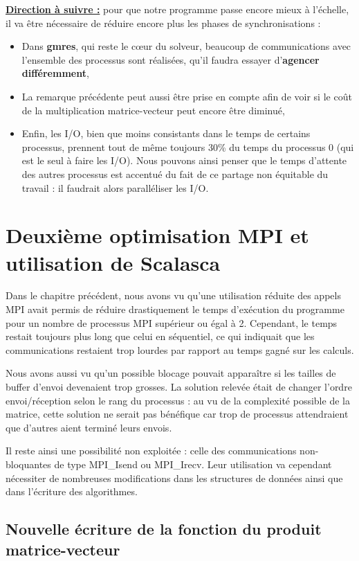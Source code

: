 \documentclass[11pt,a4paper,oneside]{memoir}
\theoremstyle{definition}
\theoremstyle{remark}
\theoremstyle{plain}
\begin{document}
\textbf{\underline{Direction à suivre :}} pour que notre programme passe encore mieux à l'échelle, il va être nécessaire de réduire encore plus les phases de synchronisations :
\begin{itemize}
\item Dans \textbf{gmres}, qui reste le cœur du solveur, beaucoup de communications avec l'ensemble des processus sont réalisées, qu'il faudra essayer d'\textbf{agencer différemment},
\item La remarque précédente peut aussi être prise en compte afin de voir si le coût de la multiplication matrice-vecteur peut encore être diminué,
\item Enfin, les I/O, bien que moins consistants dans le temps de certains processus, prennent tout de même toujours 30\% du temps du processus 0 (qui est le seul à faire les I/O). Nous pouvons ainsi penser que le temps d'attente des autres processus est accentué du fait de ce partage non équitable du travail : il faudrait alors paralléliser les I/O.
\end{itemize}




\chapter{Deuxième optimisation MPI et utilisation de Scalasca}

Dans le chapitre précédent, nous avons vu qu'une utilisation réduite des appels MPI avait permis de réduire drastiquement le temps d'exécution du programme pour un nombre de processus MPI supérieur ou égal à 2. Cependant, le temps restait toujours plus long que celui en séquentiel, ce qui indiquait que les communications restaient trop lourdes par rapport au temps gagné sur les calculs.

Nous avons aussi vu qu'un possible blocage pouvait apparaître si les tailles de buffer d'envoi devenaient trop grosses. La solution relevée était de changer l'ordre envoi/réception selon le rang du processus : au vu de la complexité possible de la matrice, cette solution ne serait pas bénéfique car trop de processus attendraient que d'autres aient terminé leurs envois.

Il reste ainsi une possibilité non exploitée : celle des communications non-bloquantes de type MPI\_Isend ou MPI\_Irecv. Leur utilisation va cependant nécessiter de nombreuses modifications dans les structures de données ainsi que dans l'écriture des algorithmes.


\section{Nouvelle écriture de la fonction du produit matrice-vecteur}
\end{document}
